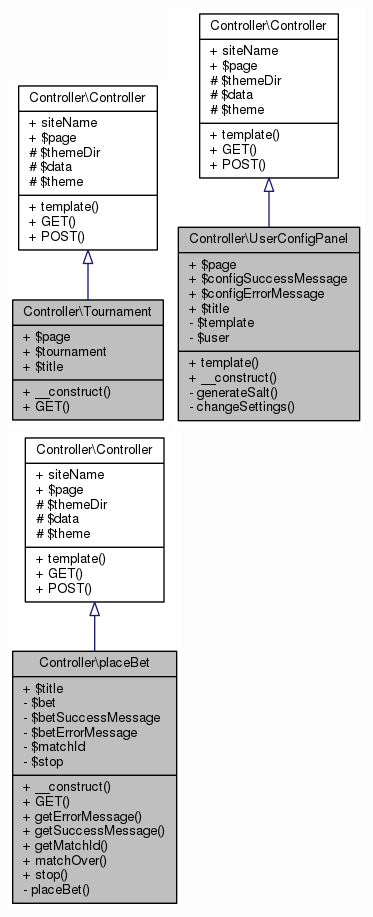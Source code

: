 \documentclass[11pt]{article}
\begin{document}
\includegraphics[scale=0.4]{UML_Controller_1_1Tournament.png}
\includegraphics[scale=0.4]{UML_Controller_1_1UserConfigPanel.png}
\includegraphics[scale=0.4]{UML_Controller_1_1placeBet.png}
\end{document}

